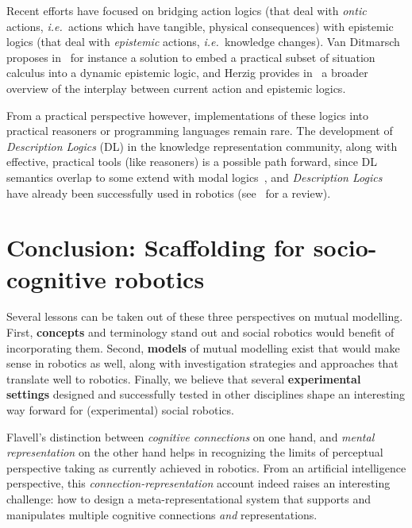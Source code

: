 \documentclass{sig-alternate}
\newcommand{\ie}{{\textit{i.e.~}}}
\begin{document}
Recent efforts have focused on bridging action logics (that deal with
\emph{ontic} actions, \ie actions which have tangible, physical consequences)
with epistemic logics (that deal with \emph{epistemic} actions, \ie knowledge
changes). Van Ditmarsch proposes in~\cite{ditmarsch2010from} for instance a
solution to embed a practical subset of situation calculus into a dynamic
epistemic logic, and Herzig provides in~\cite{herzig2014logics} a broader
overview of the interplay between current action and epistemic logics.

From a practical perspective however, implementations of these logics into
practical reasoners or programming languages remain rare. The development of
\emph{Description Logics} (DL) in the knowledge representation community, along
with effective, practical tools (like reasoners) is a possible path forward,
since DL semantics overlap to some extend with modal logics~\cite[chap.
4.2.2]{baader2003description}, and \emph{Description Logics} have already been
successfully used in robotics (see~\cite{lemaignan2012symbolic} for a review).


\section{Conclusion: Scaffolding for socio-cognitive robotics}

Several lessons can be taken out of these three perspectives on mutual modelling.
First, \textbf{concepts} and terminology stand out and social robotics would
benefit of incorporating them. Second, \textbf{models} of mutual modelling exist
that would make sense in robotics as well, along with investigation strategies
and approaches that translate well to robotics. Finally, we believe that several
\textbf{experimental settings} designed and successfully tested in other
disciplines shape an interesting way forward for (experimental) social robotics.

Flavell's distinction between \emph{cognitive connections} on one hand, and
\emph{mental representation} on the other hand helps in recognizing
the limits of perceptual perspective taking as currently achieved in robotics.
From an artificial intelligence perspective, this
\emph{connection-representation} account indeed raises an interesting challenge:
how to design a meta-representational system that supports and manipulates
multiple cognitive connections \emph{and} representations.
\end{document}
